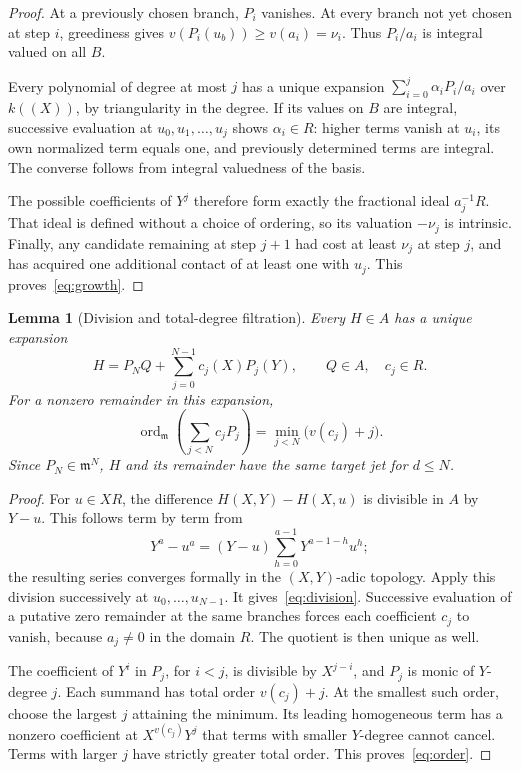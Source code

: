 \documentclass[11pt]{article}
\newtheorem{lemma}[theorem]{Lemma}
\theoremstyle{definition}
\newcommand{\m}{\mathfrak m}
\newcommand{\ord}{\operatorname{ord}}
\begin{document}
\begin{proof}
At a previously chosen branch, $P_i$ vanishes. At every branch not yet chosen at step $i$, greediness gives $v(P_i(u_b))\ge v(a_i)=\nu_i$. Thus $P_i/a_i$ is integral valued on all $B$.

Every polynomial of degree at most $j$ has a unique expansion $\sum_{i=0}^j\alpha_iP_i/a_i$ over $k((X))$, by triangularity in the degree. If its values on $B$ are integral, successive evaluation at $u_0,u_1,\ldots,u_j$ shows $\alpha_i\in R$: higher terms vanish at $u_i$, its own normalized term equals one, and previously determined terms are integral. The converse follows from integral valuedness of the basis.

The possible coefficients of $Y^j$ therefore form exactly the fractional ideal $a_j^{-1}R$. That ideal is defined without a choice of ordering, so its valuation $-\nu_j$ is intrinsic. Finally, any candidate remaining at step $j+1$ had cost at least $\nu_j$ at step $j$, and has acquired one additional contact of at least one with $u_j$. This proves~\eqref{eq:growth}.
\end{proof}

\begin{lemma}[Division and total-degree filtration]\label{lem:division}
Every $H\in A$ has a unique expansion
\begin{equation}\label{eq:division}
 H=P_NQ+\sum_{j=0}^{N-1}c_j(X)P_j(Y),\qquad Q\in A,\quad c_j\in R.
\end{equation}
For a nonzero remainder in this expansion,
\begin{equation}\label{eq:order}
 \ord_{\m}\!\left(\sum_{j<N}c_jP_j\right)
 =\min_{j<N}\bigl(v(c_j)+j\bigr).
\end{equation}
Since $P_N\in\m^N$, $H$ and its remainder have the same target jet for $d\le N$.
\end{lemma}

\begin{proof}
For $u\in XR$, the difference $H(X,Y)-H(X,u)$ is divisible in $A$ by $Y-u$. This follows term by term from
\[
 Y^a-u^a=(Y-u)\sum_{h=0}^{a-1}Y^{a-1-h}u^h;
\]
the resulting series converges formally in the $(X,Y)$-adic topology. Apply this division successively at $u_0,\ldots,u_{N-1}$. It gives~\eqref{eq:division}. Successive evaluation of a putative zero remainder at the same branches forces each coefficient $c_j$ to vanish, because $a_j\ne0$ in the domain $R$. The quotient is then unique as well.

The coefficient of $Y^i$ in $P_j$, for $i<j$, is divisible by $X^{j-i}$, and $P_j$ is monic of $Y$-degree $j$. Each summand has total order $v(c_j)+j$. At the smallest such order, choose the largest $j$ attaining the minimum. Its leading homogeneous term has a nonzero coefficient at $X^{v(c_j)}Y^j$ that terms with smaller $Y$-degree cannot cancel. Terms with larger $j$ have strictly greater total order. This proves~\eqref{eq:order}.
\end{proof}
\end{document}
